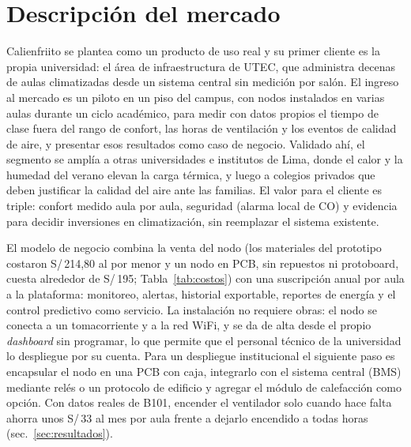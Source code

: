 \documentclass[10pt,a4paper]{article}
\begin{document}
\section{Descripción del mercado}
Calienfriito se plantea como un producto de uso real y su primer cliente es la propia universidad: el área de infraestructura de UTEC, que administra decenas de aulas climatizadas desde un sistema central sin medición por salón. El ingreso al mercado es un piloto en un piso del campus, con nodos instalados en varias aulas durante un ciclo académico, para medir con datos propios el tiempo de clase fuera del rango de confort, las horas de ventilación y los eventos de calidad de aire, y presentar esos resultados como caso de negocio. Validado ahí, el segmento se amplía a otras universidades e institutos de Lima, donde el calor y la humedad del verano elevan la carga térmica, y luego a colegios privados que deben justificar la calidad del aire ante las familias. El valor para el cliente es triple: confort medido aula por aula, seguridad (alarma local de CO) y evidencia para decidir inversiones en climatización, sin reemplazar el sistema existente.

El modelo de negocio combina la venta del nodo (los materiales del prototipo costaron S/\,214,80 al por menor y un nodo en PCB, sin repuestos ni protoboard, cuesta alrededor de S/\,195; Tabla~\ref{tab:costos}) con una suscripción anual por aula a la plataforma: monitoreo, alertas, historial exportable, reportes de energía y el control predictivo como servicio. La instalación no requiere obras: el nodo se conecta a un tomacorriente y a la red WiFi, y se da de alta desde el propio \emph{dashboard} sin programar, lo que permite que el personal técnico de la universidad lo despliegue por su cuenta. Para un despliegue institucional el siguiente paso es encapsular el nodo en una PCB con caja, integrarlo con el sistema central (BMS) mediante relés o un protocolo de edificio y agregar el módulo de calefacción como opción. Con datos reales de B101, encender el ventilador solo cuando hace falta ahorra unos S/\,33 al mes por aula frente a dejarlo encendido a todas horas (sec.~\ref{sec:resultados}).
\end{document}

